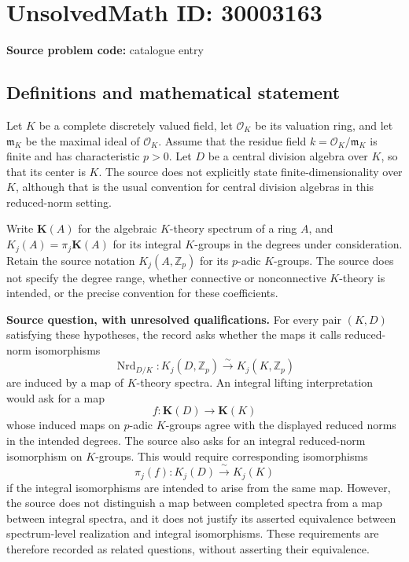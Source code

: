 \documentclass[11pt]{article}
\begin{document}
\section*{UnsolvedMath ID: 30003163}
\textbf{Source problem code:} catalogue entry
\subsection{Definitions and mathematical statement}
Let \(K\) be a complete discretely valued field, let \(\mathcal O_K\) be its valuation ring, and let \(\mathfrak m_K\) be the maximal ideal of \(\mathcal O_K\). Assume that the residue field \(k=\mathcal O_K/\mathfrak m_K\) is finite and has characteristic \(p>0\). Let \(D\) be a central division algebra over \(K\), so that its center is \(K\). The source does not explicitly state finite-dimensionality over \(K\), although that is the usual convention for central division algebras in this reduced-norm setting.

Write \(\mathbf K(A)\) for the algebraic \(K\)-theory spectrum of a ring \(A\), and \(K_j(A)=\pi_j\mathbf K(A)\) for its integral \(K\)-groups in the degrees under consideration. Retain the source notation \(K_j(A,\mathbb Z_p)\) for its \(p\)-adic \(K\)-groups. The source does not specify the degree range, whether connective or nonconnective \(K\)-theory is intended, or the precise convention for these coefficients.

\textbf{Source question, with unresolved qualifications.} For every pair \((K,D)\) satisfying these hypotheses, the record asks whether the maps it calls reduced-norm isomorphisms
\[
\operatorname{Nrd}_{D/K}\colon K_j(D,\mathbb Z_p)\xrightarrow{\;\sim\;}K_j(K,\mathbb Z_p)
\]
are induced by a map of \(K\)-theory spectra. An integral lifting interpretation would ask for a map
\[
f\colon\mathbf K(D)\longrightarrow\mathbf K(K)
\]
whose induced maps on \(p\)-adic \(K\)-groups agree with the displayed reduced norms in the intended degrees. The source also asks for an integral reduced-norm isomorphism on \(K\)-groups. This would require corresponding isomorphisms
\[
\pi_j(f)\colon K_j(D)\xrightarrow{\;\sim\;}K_j(K)
\]
if the integral isomorphisms are intended to arise from the same map. However, the source does not distinguish a map between completed spectra from a map between integral spectra, and it does not justify its asserted equivalence between spectrum-level realization and integral isomorphisms. These requirements are therefore recorded as related questions, without asserting their equivalence.
\end{document}
